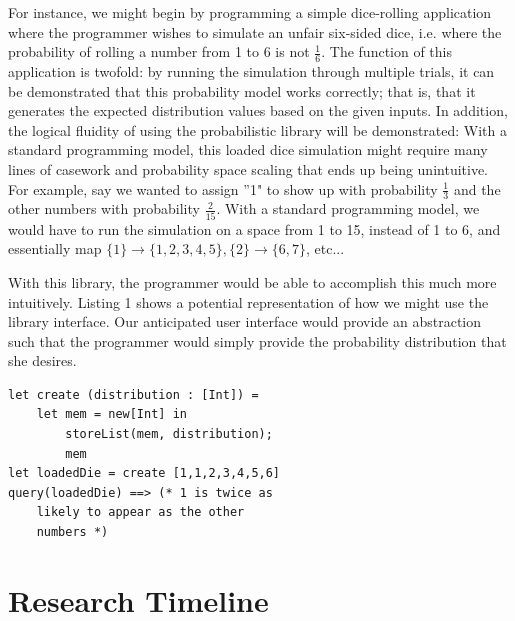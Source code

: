 \documentclass{sig-alternate}
\begin{document}
For instance, we might begin by programming a simple dice-rolling application where the programmer wishes
to simulate an unfair six-sided dice, i.e. where the probability of rolling a number from 1 to 6 is not $\frac{1}{6}$.
The function of this application is twofold: by running the simulation through multiple trials, it can be demonstrated 
that this probability model works correctly; that is, that it generates the expected distribution values
based on the given inputs. In addition, the logical fluidity of using the probabilistic library will be demonstrated:
With a standard programming model, this loaded dice simulation might require many lines of casework and probability space scaling
that ends up being unintuitive. For example, say we wanted to assign ''1" to show up with probability $\frac{1}{3}$
and the other numbers with probability $\frac{2}{15}$. With a standard programming model, we would have to run the simulation on a space from
1 to 15, instead of 1 to 6, and essentially map $\{1\} \rightarrow \{1, 2, 3, 4, 5\}, \{2\} \rightarrow \{6, 7\}$, etc...

With this library, the programmer would be able to accomplish this much more intuitively. Listing 1 shows a potential representation of how we might use the library interface. Our
anticipated user interface would provide an abstraction such that the programmer would simply
provide the probability distribution that she desires.

\begin{lstlisting}[frame=single]
let create (distribution : [Int]) =
    let mem = new[Int] in
        storeList(mem, distribution);
        mem
let loadedDie = create [1,1,2,3,4,5,6]
query(loadedDie) ==> (* 1 is twice as 
    likely to appear as the other 
    numbers *)
\end{lstlisting}

\section{Research Timeline}
\label{sec:research_timeline}
\end{document}
